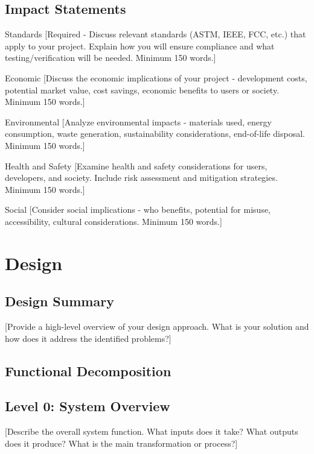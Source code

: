 \documentclass[final]{../designreport}
\newcommand{\impactstatements}{\subsection{Impact Statements}}
\newcommand{\designsection}{\section{Design}}
\newcommand{\designsummary}{\subsection{Design Summary}}
\newcommand{\functionaldecomp}{\subsection{Functional Decomposition}}
\begin{document}
\impactstatements

\begin{impactstatement}{Standards}
[Required - Discuss relevant standards (ASTM, IEEE, FCC, etc.) that apply to your project. Explain how you will ensure compliance and what testing/verification will be needed. Minimum 150 words.]
\end{impactstatement}

\begin{impactstatement}{Economic}
[Discuss the economic implications of your project - development costs, potential market value, cost savings, economic benefits to users or society. Minimum 150 words.]
\end{impactstatement}

\begin{impactstatement}{Environmental}
[Analyze environmental impacts - materials used, energy consumption, waste generation, sustainability considerations, end-of-life disposal. Minimum 150 words.]
\end{impactstatement}

\begin{impactstatement}{Health and Safety}
[Examine health and safety considerations for users, developers, and society. Include risk assessment and mitigation strategies. Minimum 150 words.]
\end{impactstatement}

\begin{impactstatement}{Social}
[Consider social implications - who benefits, potential for misuse, accessibility, cultural considerations. Minimum 150 words.]
\end{impactstatement}

\designsection

\designsummary
[Provide a high-level overview of your design approach. What is your solution and how does it address the identified problems?]

\functionaldecomp

\subsection{Level 0: System Overview}
[Describe the overall system function. What inputs does it take? What outputs does it produce? What is the main transformation or process?]

\end{document}
